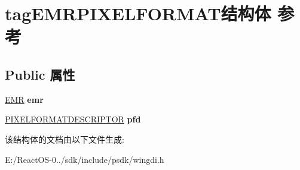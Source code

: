 \hypertarget{structtag_e_m_r_p_i_x_e_l_f_o_r_m_a_t}{}\section{tag\+E\+M\+R\+P\+I\+X\+E\+L\+F\+O\+R\+M\+A\+T结构体 参考}
\label{structtag_e_m_r_p_i_x_e_l_f_o_r_m_a_t}
\subsection*{Public 属性}
\begin{DoxyCompactItemize}
\item 
\mbox{\label{structtag_e_m_r_p_i_x_e_l_f_o_r_m_a_t_a1b97032537434d8bfa85fd24fd6a40fd}} 
\hyperlink{structtag_e_m_r}{E\+MR} {\bfseries emr}
\item 
\mbox{\label{structtag_e_m_r_p_i_x_e_l_f_o_r_m_a_t_a2553f98fc629841ce4d5023c5b51e0bb}} 
\hyperlink{structtag_p_i_x_e_l_f_o_r_m_a_t_d_e_s_c_r_i_p_t_o_r}{P\+I\+X\+E\+L\+F\+O\+R\+M\+A\+T\+D\+E\+S\+C\+R\+I\+P\+T\+OR} {\bfseries pfd}
\end{DoxyCompactItemize}


该结构体的文档由以下文件生成\+:\begin{DoxyCompactItemize}
\item 
E\+:/\+React\+O\+S-\/0../sdk/include/psdk/wingdi.\+h\end{DoxyCompactItemize}
